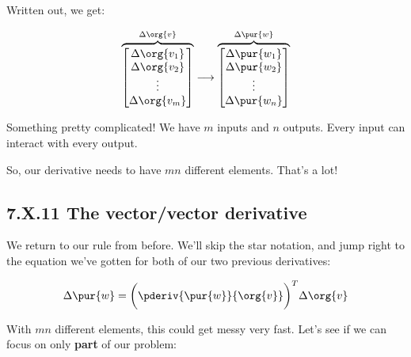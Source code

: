         Written out, we get:
        
        \begin{equation}
            \overbrace{
                \begin{bmatrix}
                    \Delta \org{v_1}\\ \Delta \org{v_2}\\ \vdots \\ \Delta \org{v_m}
                \end{bmatrix}
            }^{\Delta \org{v}}
            \longrightarrow 
            \overbrace{
                \begin{bmatrix}
                    \Delta \pur{w_1}\\ \Delta \pur{w_2}\\ \vdots \\ \Delta \pur{w_n}
                \end{bmatrix}
            }^{\Delta \pur{w}}
        \end{equation}
        
        Something pretty complicated! We have $m$ inputs and $n$ outputs. Every input can interact with every output.
        
        So, our derivative needs to have $mn$ different elements. That's a lot!
    
    \secdiv
    
    \subsection*{7.X.11 \quad The vector/vector derivative}  
    
        We return to our rule from before. We'll skip the star notation, and jump right to the equation we've gotten for both of our two previous derivatives:
        
        \begin{equation}
            \Delta \pur{w}
            =
            \bigg(
                \pderiv{ \pur{w} }{ \org{v} } 
            \bigg)^T
            \Delta \org{v}
        \end{equation}
        
        With $mn$ different elements, this could get messy very fast. Let's see if we can focus on only \textbf{part} of our problem:
        
